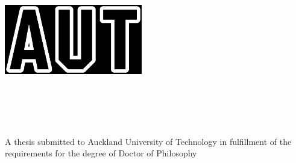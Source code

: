 %


\begin{titlepage}
	\tgherosfont
	\centering

	\includegraphics[width=6cm]{fig/AUT.eps} \\[2mm]
	\textsf{\thesisUniversityDepartment} \\
	\textsf{\thesisUniversityInstitute} \\
	\textsf{\thesisUniversityGroup} \\

	\vfill
	{\LARGE \color{ctcolortitle}\textbf{\thesisTitle} \\[10mm]}
	{\Large \thesisName}\\[4mm]
	{\textsf A thesis submitted to Auckland University of Technology in fulfillment of the requirements for the degree of Doctor of Philosophy}
	\\


\end{titlepage}

